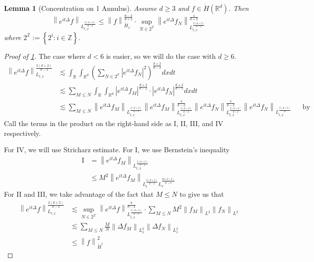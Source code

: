 \documentclass{article}
\newtheorem{lemma}{Lemma}
\def\R{\mathbb{R}} %
\def\Z{\mathbb{Z}} %
\newcommand\norm[1]{\left\lVert#1\right\rVert}
\begin{document}
\begin{lemma}[Concentration on 1 Annulus]
  \label{lem:concentration-1-annulus}
  Assume $d \geq 3$ and $f\in \mathring{H}(\R^d)$. Then
  \begin{equation*}
    \norm{e^{it\Delta}f}_{L_{t,x}^{\frac{2(d+2)}{d-2}}} 
    \leq \norm{f}_{\mathring{H}_{x}}^{\frac{d-2}{d+2}} \cdot
    \sup_{N\in 2^{\Z}} \norm{e^{it\Delta}f_{N}}_{L_{t,x}^{\frac{2(d+2)}{d-2}}}^{\frac{4}{d+2}}
  \end{equation*}
  where $2^{\Z}:= \left\{2^{i}:i\in \Z\right\}$. 
\end{lemma}
\begin{proof}[Proof of \cref{lem:concentration-1-annulus}]
  The case where $d<6$ is easier, so we will do the case with $d \geq 6$.
  \begin{align*}
    \norm{e^{it\Delta}f}_{L_{t,x}}^{\frac{2(d+2)}{d-2}}
    &\lesssim 
      \int_{\R}\int_{\R^{d}} \left( \sum_{N\in 2^{\Z}}\left| e^{it\Delta}f_{N} \right|^{2} \right)^{\frac{d+2}{d-2}}dxdt\\
    &\lesssim
      \sum_{M \leq N}  \int_{\R}\int_{\R^{d}} \left| e^{it\Delta}f_{M} \right|^{\frac{d+2}{d-2}}\cdot\left| e^{it\Delta}f_{N} \right|^{\frac{d+2}{d-2}}dxdt\\
    &\lesssim
      \sum_{M \leq N}
      \norm{e^{it\Delta}f_{M}}_{L_{t,x}^{\frac{2(d+2)}{d-4}}}
      \norm{e^{it\Delta}f_{M}}_{L_{t,x}^{\frac{2(d+2)}{d-2}}}^{\frac{4}{d-2}}
      \norm{e^{it\Delta}f_{N}}_{L_{t,x}^{\frac{2(d+2)}{d-2}}}^{\frac{4}{d-2}}
      \norm{e^{it\Delta}f_{N}}_{L_{t,x}^{\frac{2(d+2)}{d}}}
      &&\text{by Holder's inequality}
  \end{align*}
  Call the terms in the product on the right-hand side as I, II, III, and IV
  respectively.

  For IV, we will use Stricharz estimate.
  For I, we use Bernstein's inequality
  \begin{align*}
    \mathrm{I}
    &= \norm{e^{it\Delta}f_{M}}_{L_{t,x}^{\frac{2(d+2)}{d-4}}}\\
    &\leq M^{2} \norm{e^{it\Delta}f_{M}}_{L_{t}^{\frac{2(d+2)}{d-2}}L_{x}^{\frac{2d(d+2)}{d^{2}+8}}}
  \end{align*}
  For II and III, we take advantage of the fact that $M \leq N$ to give us that
  \begin{align*}
    \norm{e^{it\Delta}f}_{L_{t,x}}^{\frac{2(d+2)}{d-2}} 
    &\lesssim \sup_{N \in 2^{\Z}}\norm{e^{it\Delta}f}_{L_{t,x}^{\frac{2(d+2)}{d-2}}}^{\frac{8}{d-2}}
      \cdot \sum_{M \leq N} M^{2}\norm{f_{M}}_{L^{2}}\norm{f_{N}}_{L^{2}} \\
    &\lesssim \sum_{M \leq N} \frac{M}{N} \norm{\Delta f_{M}}_{L^2_{x}}\norm{\Delta f_{N}}_{L^2_{x}} \\
    &\leq \norm{f}_{\mathring{H}^{1}}^{2}
  \end{align*}
\end{proof}
\end{document}
